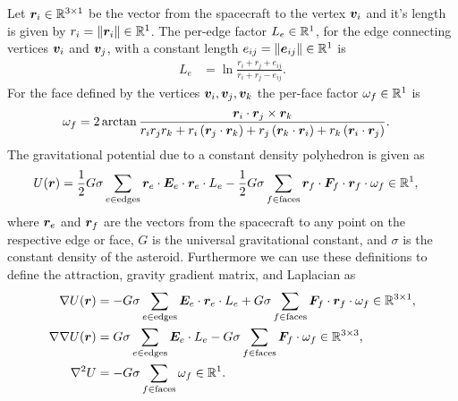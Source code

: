 \documentclass[letterpaper, paper,11pt]{AAS}		%
\begin{document}
Let \( \bm{r}_i \in \mathbb{R}^{3 \times 1} \) be the vector from the spacecraft to the vertex \( \bm{v}_i \) and it's length is given by \( r_i = \left\| \bm{r}_i \right\| \in \mathbb{R}^{1} \).
The per-edge factor \( L_e \in \mathbb{R}^{1}\), for the edge connecting vertices \( \bm{v}_i \) and \( \bm{v}_j \), with a constant length \( e_{ij} = \left\| \bm{e}_{ij} \right\| \in \mathbb{R}^1\) is
\begin{align}\label{eq:edge_factor}
    L_e &= \ln \frac{r_i + r_j + e_{ij}}{r_i + r_j - e_{ij}}.
\end{align}
For the face defined by the vertices \( \bm{v}_i, \bm{v}_j, \bm{v}_k \) the per-face factor \( \omega_f \in \mathbb{R}^{1} \) is
\begin{align}\label{eq:face_factor}
    \omega_f &= 2 \arctan \frac{\bm{r}_i \cdot \bm{r}_j \times \bm{r}_k}{r_i r_j r_k + r_i \left( \bm{r}_j \cdot \bm{r}_k \right) + r_j \left( \bm{r}_k \cdot \bm{r}_i \right) + r_k \left( \bm{r}_i \cdot \bm{r}_j \right)} .
\end{align}
The gravitational potential due to a constant density polyhedron is given as
\begin{align}\label{eq:potential}
    U(\bm{r}) &= \frac{1}{2} G \sigma \sum_{e \in \text{edges}} \bm{r}_e \cdot \bm{E}_e \cdot \bm{r}_e \cdot L_e - \frac{1}{2}G \sigma \sum_{f \in \text{faces}} \bm{r}_f \cdot \bm{F}_f \cdot \bm{r}_f \cdot \omega_f \in \mathbb{R}^1,
\end{align}
where \( \bm{r}_e\) and \(\bm{r}_f \) are the vectors from the spacecraft to any point on the respective edge or face, \( G\) is the universal gravitational constant, and \( \sigma \) is the constant density of the asteroid.
Furthermore we can use these definitions to define the attraction, gravity gradient matrix, and Laplacian as
\begin{align}
    \nabla U ( \bm{r} ) &= -G \sigma \sum_{e \in \text{edges}} \bm{E}_e \cdot \bm{r}_e \cdot L_e + G \sigma \sum_{f \in \text{faces}} \bm{F}_f \cdot \bm{r}_f \cdot \omega_f \in \mathbb{R}^{3 \times 1} , \label{eq:attraction}\\
    \nabla \nabla U ( \bm{r} ) &= G \sigma \sum_{e \in \text{edges}} \bm{E}_e  \cdot L_e - G \sigma \sum_{f \in \text{faces}} \bm{F}_f \cdot \omega_f \in \mathbb{R}^{3 \times 3}, \label{eq:gradient_matrix}\\
    \nabla^2 U &= -G \sigma \sum_{f \in \text{faces}}  \omega_f \in \mathbb{R}^1 .\label{eq:laplacian}
\end{align}
\end{document}
